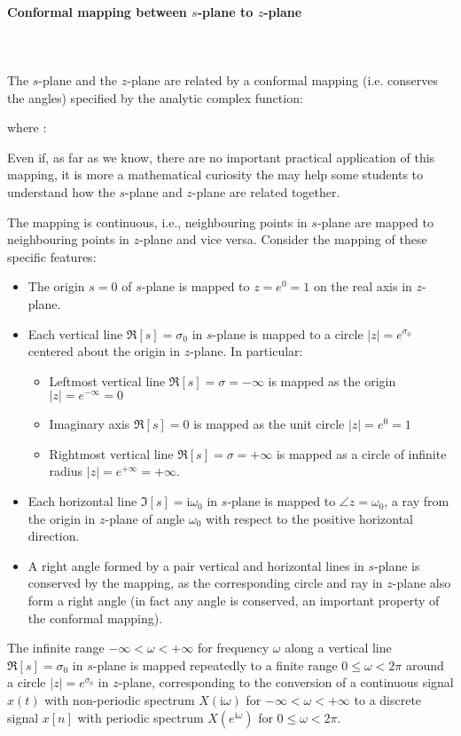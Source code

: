 	
	\paragraph{Conformal mapping between $s$-plane to $z$-plane}\mbox{}\\\\
	The $s$-plane and the $z$-plane are related by a conformal mapping (i.e. conserves the angles) specified by the analytic complex function:
	
	where :
	
	Even if, as far as we know, there are no important practical application of this mapping, it is more a mathematical curiosity the may help some students to understand how the $s$-plane and $z$-plane are related together.
	
	The mapping is continuous, i.e., neighbouring points in $s$-plane are mapped to neighbouring points in $z$-plane and vice versa. Consider the mapping of these specific features: 
	\begin{itemize}
		\item The origin $s=0$ of $s$-plane is mapped to $z=e^0=1$ on the real axis in $z$-plane.
		\item Each vertical line $\Re[s]=\sigma_0$ in $s$-plane is mapped to a circle $|z|=e^{\sigma_0}$ centered about the origin in $z$-plane. In particular:
			\begin{itemize}
			\item Leftmost vertical line $\Re[s]=\sigma=-\infty$ is mapped as the origin $|z|=e^{-\infty}=0$
			\item Imaginary axis $\Re[s]=0$ is mapped as the unit circle $|z|=e^0=1$
			\item Rightmost vertical line $\Re[s]=\sigma={+\infty}$ is mapped as a circle of infinite radius $|z|=e^{{+\infty}}={+\infty}$.
			\end{itemize}
		\item Each horizontal line $\Im[s]=\mathrm{i}\omega_0$ in $s$-plane is mapped to $\angle{z}=\omega_0$, a ray from the origin in $z$-plane of angle $\omega_0$ with respect to the positive horizontal direction. 
		\item A right angle formed by a pair vertical and horizontal lines in $s$-plane is conserved by the mapping, as the corresponding circle and ray in $z$-plane also form a right angle (in fact any angle is conserved, an important property of the conformal mapping).
	\end{itemize}
	The infinite range $-\infty < \omega < {+\infty}$ for frequency $\omega$ along a vertical line $\Re[s]=\sigma_0$ in $s$-plane is mapped repeatedly to a finite range $0 \le \omega < 2\pi$ around a circle $|z|=e^{\sigma_0}$ in $z$-plane, corresponding to the conversion of a continuous signal $x(t)$ with non-periodic spectrum $X(\mathrm{i}\omega)$ for $-\infty < \omega < {+\infty}$ to a discrete signal $x[n]$ with periodic spectrum $X(e^{\mathrm{i}\omega})$ for $0 \le \omega < 2\pi$.
	
